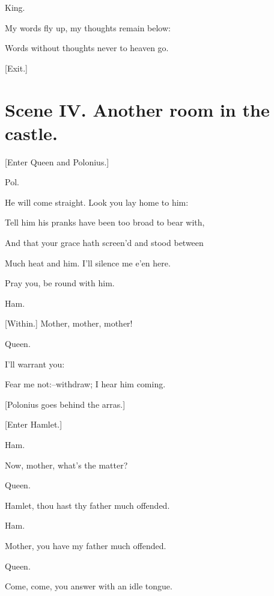 \documentclass[12pt]{book}
\begin{document}
King.

My words fly up, my thoughts remain below:

Words without thoughts never to heaven go.



[Exit.]







\section*{Scene IV. Another room in the castle.}



[Enter Queen and Polonius.]



Pol.

He will come straight. Look you lay home to him:

Tell him his pranks have been too broad to bear with,

And that your grace hath screen'd and stood between

Much heat and him. I'll silence me e'en here.

Pray you, be round with him.



Ham.

[Within.] Mother, mother, mother!



Queen.

I'll warrant you:

Fear me not:--withdraw; I hear him coming.



[Polonius goes behind the arras.]



[Enter Hamlet.]



Ham.

Now, mother, what's the matter?



Queen.

Hamlet, thou hast thy father much offended.



Ham.

Mother, you have my father much offended.



Queen.

Come, come, you answer with an idle tongue.
\end{document}
